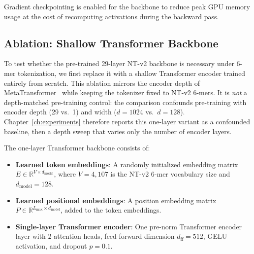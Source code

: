 Gradient checkpointing is enabled for the backbone to reduce peak GPU memory usage at the cost of recomputing activations during the backward pass.

\subsection{Ablation: Shallow Transformer Backbone}
\label{sec:method-shallow}

To test whether the pre-trained 29-layer NT-v2 backbone is necessary under 6-mer tokenization, we first replace it with a shallow Transformer encoder trained entirely from scratch. This ablation mirrors the encoder depth of MetaTransformer~\cite{Wichmann2023} while keeping the tokenizer fixed to NT-v2 6-mers. It is \emph{not} a depth-matched pre-training control: the comparison confounds pre-training with encoder depth (29 vs.\ 1) and width ($d{=}1024$ vs.\ $d{=}128$). Chapter~\ref{ch:experiments} therefore reports this one-layer variant as a confounded baseline, then a depth sweep that varies only the number of encoder layers.

The one-layer Transformer backbone consists of:
\begin{itemize}
    \item \textbf{Learned token embeddings}: A randomly initialized embedding matrix $E \in \mathbb{R}^{V \times d_{\text{model}}}$, where $V = 4{,}107$ is the NT-v2 6-mer vocabulary size and $d_{\text{model}} = 128$.
    \item \textbf{Learned positional embeddings}: A position embedding matrix $P \in \mathbb{R}^{L_{\max} \times d_{\text{model}}}$, added to the token embeddings.
    \item \textbf{Single-layer Transformer encoder}: One pre-norm Transformer encoder layer with 2 attention heads, feed-forward dimension $d_{\text{ff}} = 512$, GELU activation, and dropout $p = 0.1$.
\end{itemize}

